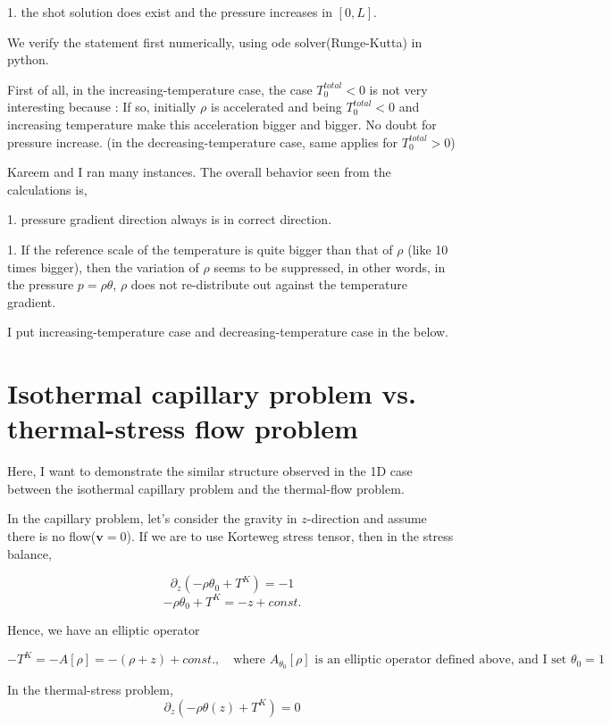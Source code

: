 \documentclass[a4paper,12pt]{article}
\begin{document}
 1. the shot solution does exist and the pressure increases in $[0,L]$.

We verify the statement first numerically, using ode solver(Runge-Kutta) in python.

First of all, in the increasing-temperature case, the case {{{$T^{total}_0<0$}}} is not very interesting because : If so, initially $\rho$ is accelerated and being {{{$T^{total}_0<0$}}} and increasing temperature make this acceleration bigger and bigger. No doubt for pressure increase. (in the decreasing-temperature case, same applies for {{{$T^{total}_0>0$}}})

Kareem and I ran many instances. The overall behavior seen from the calculations is,

 1. pressure gradient direction always is in correct direction.

 1. If the reference scale of the temperature is quite bigger than that of $\rho$ (like 10 times bigger), then the variation of $\rho$ seems to be suppressed, in other words, in the pressure $p=\rho\theta$, $\rho$ does not re-distribute out against the temperature gradient.

I put increasing-temperature case and decreasing-temperature case in the below.


\section{Isothermal capillary problem vs. thermal-stress flow problem}
Here, I want to demonstrate the similar structure observed in the 1D case between the isothermal capillary problem and the thermal-flow problem.

In the capillary problem, let's consider the gravity in $z$-direction and assume there is no flow($\mathbf{v}=0$). If we are to use Korteweg stress tensor, then in the stress balance,

{{{$$\partial_z(-\rho\theta_0 + T^K) = -1$$}}} {{{$$-\rho\theta_0 + T^K = -z + const.$$}}}

Hence, we have an elliptic operator

{{{$$-T^K = -A[\rho] = -(\rho +z) + const., \quad \text{where $A_{\theta_0}[\rho]$ is an elliptic operator defined above, and I set $\theta_0=1$} $$}}}

In the thermal-stress problem, {{{$$\partial_z(-\rho\theta(z) + T^K) = 0$$}}}
\end{document}
